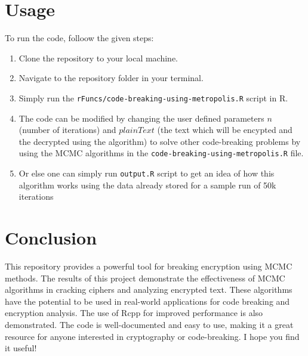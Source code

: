 \documentclass{article}
\begin{document}
\section{Usage}

To run the code, folloow the given steps:

\begin{enumerate}
    \item Clone the repository to your local machine.
    \item Navigate to the repository folder in your terminal.
    \item Simply run the  \texttt{rFuncs/code-breaking-using-metropolis.R} script in R.
    \item The code can be modified by changing the user defined parameters $n$ (number of iterations) and  $plainText$ (the text which will be encypted and the decrypted using the algorithm) to solve other code-breaking problems by using the MCMC algorithms in the \texttt{code-breaking-using-metropolis.R} file.
    \item Or else one can simply run \texttt{output.R} script to get an idea of how this algorithm works using the data already stored for a sample run of 50k iterations
    
\end{enumerate}

\section{Conclusion}

This repository provides a powerful tool for breaking encryption using MCMC methods.  
The results of this project demonstrate the effectiveness of MCMC algorithms in cracking ciphers and analyzing encrypted text. These algorithms have the potential to be used in real-world applications for code breaking and encryption analysis. The use of Rcpp for improved performance is also demonstrated.
\newline
The code is well-documented and easy to use, making it a great resource for anyone interested in cryptography or code-breaking. I hope you find it useful!
\end{document}
